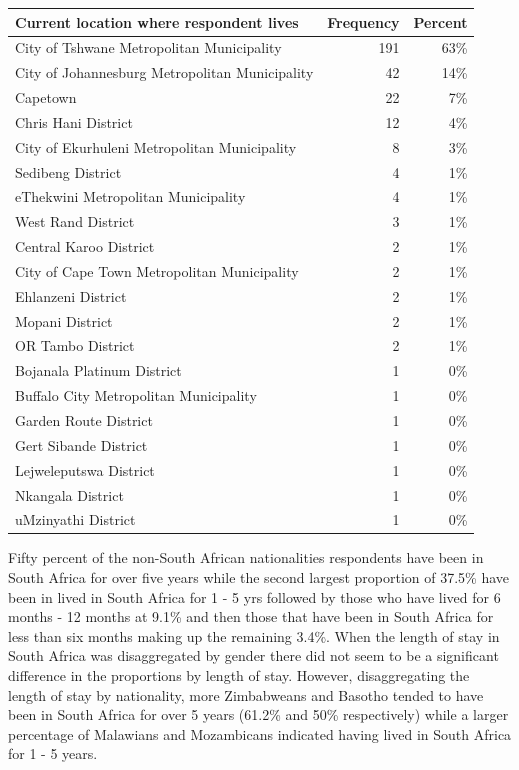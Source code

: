 \documentclass[
  letterpaper,
  DIV=11,
  numbers=noendperiod]{scrartcl}
\begin{document}
\begin{table}
\fontsize{12.0pt}{14.4pt}\selectfont
\begin{tabular*}{\linewidth}{@{\extracolsep{\fill}}lrr}
\toprule
Current location where respondent lives & Frequency & Percent \\ 
\midrule\addlinespace[2.5pt]
City of Tshwane Metropolitan Municipality & 191 & 63\% \\ 
City of Johannesburg Metropolitan Municipality & 42 & 14\% \\ 
Capetown & 22 & 7\% \\ 
Chris Hani District & 12 & 4\% \\ 
City of Ekurhuleni Metropolitan Municipality & 8 & 3\% \\ 
Sedibeng District & 4 & 1\% \\ 
eThekwini Metropolitan Municipality & 4 & 1\% \\ 
West Rand District & 3 & 1\% \\ 
Central Karoo District & 2 & 1\% \\ 
City of Cape Town Metropolitan Municipality & 2 & 1\% \\ 
Ehlanzeni District & 2 & 1\% \\ 
Mopani District & 2 & 1\% \\ 
OR Tambo District & 2 & 1\% \\ 
Bojanala Platinum District & 1 & 0\% \\ 
Buffalo City Metropolitan Municipality & 1 & 0\% \\ 
Garden Route District & 1 & 0\% \\ 
Gert Sibande District & 1 & 0\% \\ 
Lejweleputswa District & 1 & 0\% \\ 
Nkangala District & 1 & 0\% \\ 
uMzinyathi District & 1 & 0\% \\ 
\bottomrule
\end{tabular*}
\end{table}

Fifty percent of the non-South African nationalities respondents have
been in South Africa for over five years while the second largest
proportion of 37.5\% have been in lived in South Africa for 1 - 5 yrs
followed by those who have lived for 6 months - 12 months at 9.1\% and
then those that have been in South Africa for less than six months
making up the remaining 3.4\%. When the length of stay in South Africa
was disaggregated by gender there did not seem to be a significant
difference in the proportions by length of stay. However, disaggregating
the length of stay by nationality, more Zimbabweans and Basotho tended
to have been in South Africa for over 5 years (61.2\% and 50\%
respectively) while a larger percentage of Malawians and Mozambicans
indicated having lived in South Africa for 1 - 5 years.
\end{document}
